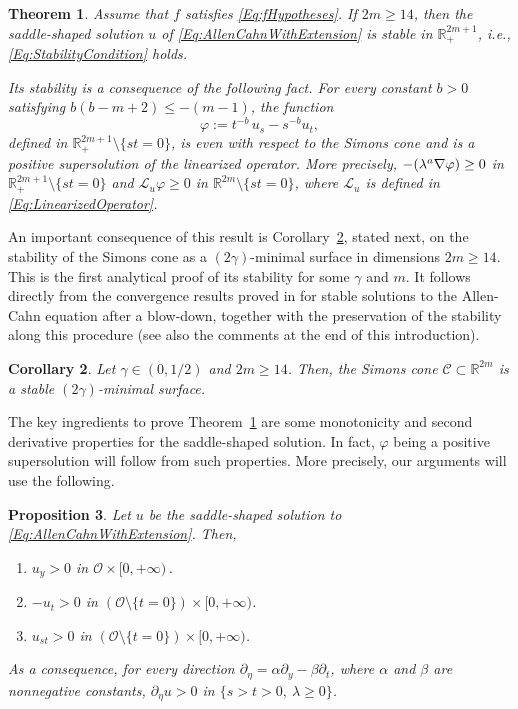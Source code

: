 \documentclass[twoside,leqno,symbols-for-thanks, draft]{rmi}
\numberwithin{equation}{section}
\newtheorem{theorem}{Theorem}[section]
\newtheorem{proposition}[theorem]{Proposition}
\newtheorem{corollary}[theorem]{Corollary}
\theoremstyle{definition}
\newcommand{\con}[1]{\mathbb{#1}}
\newcommand{\R}{\con{R}} %
\newcommand{\ccal}{\mathscr{C}}
\newcommand{\ocal}{\mathcal{O}}
\newcommand{\s}{\gamma}
\let\div\relax
\DeclareMathOperator{\div}{div}
\begin{document}
\begin{theorem}
	\label{Thm:Stability}
	Assume that $f$ satisfies \eqref{Eq:fHypotheses}. If $2m\geq 14$, then the saddle-shaped solution $u$ of \eqref{Eq:AllenCahnWithExtension} is stable in $\R^{2m+1}_+$, i.e., \eqref{Eq:StabilityCondition} holds. 
	
	Its stability is a consequence of the following fact. For every constant $b>0$ satisfying $b(b-m+2)\leq -(m-1)$, the function
	$$
	\varphi := t^{-b} \, u_s - s^{-b} u_t, 
	$$
	defined in $\R^{2m+1}_+\setminus\{st=0\}$, is even with respect to the Simons cone and is a positive supersolution of the linearized operator. More precisely, $-\div(\lambda^a \nabla \varphi) \geq 0$ in $\R^{2m+1}_+\setminus\{st=0\}$ and $\mathscr{L}_u \varphi \geq 0$ in $\R^{2m}\setminus\{st=0\}$, where $\mathscr{L}_u$ is defined in \eqref{Eq:LinearizedOperator}.
\end{theorem}

An important consequence of this result is Corollary~\ref{Cor:SimonsConeStableDim14}, stated next, on the stability of the Simons cone as a $(2\s)$-minimal surface in dimensions $2m\geq 14$. This is the first analytical proof of its stability for some $\s$ and $m$. It follows directly from the convergence results proved in \cite{CabreCintiSerra-Stable} for stable solutions to the Allen-Cahn equation after a blow-down, together with the preservation of the stability along this procedure (see also the comments at the end of this introduction).

\begin{corollary}
	\label{Cor:SimonsConeStableDim14}
	Let $\s \in (0,1/2)$ and $2m\geq 14$. Then, the Simons cone $\ccal \subset \R^{2m}$ is a stable $(2\s)$-minimal surface.
\end{corollary}


The key ingredients to prove Theorem~\ref{Thm:Stability} are some monotonicity and second derivative properties for the saddle-shaped solution. In fact, $\varphi$ being a positive supersolution will follow from such properties. More precisely, our arguments will use the following.

\begin{proposition}
	\label{Prop:MonotonicityProperties}
	Let $u$ be the saddle-shaped solution to \eqref{Eq:AllenCahnWithExtension}. Then,
	\begin{enumerate}[label=(\roman{*})]
		\item $u_y > 0$ in $\ocal \times [0, +\infty)$\,.
		\item $-u_t > 0$ in $(\ocal \setminus \{ t= 0\}) \times [0,+\infty)$.
		\item $u_{st} > 0$ in $(\ocal\setminus \{ t = 0\})\times [0,+\infty)$.
	\end{enumerate}
	As a consequence, for every direction $\partial_\eta = \alpha \partial_y - \beta \partial_t$, where $\alpha$ and $\beta$ are nonnegative constants, $\partial_\eta u > 0$ in $ \{s > t > 0,\ \lambda \geq 0\}$.
\end{proposition}
\end{document}
